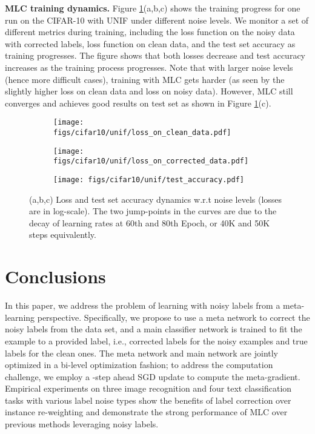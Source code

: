 \textbf{MLC training dynamics.} Figure \ref{fig:loss}(a,b,c) shows the training progress for one run
on the CIFAR-10 with \textsf{UNIF} under different noise levels. We
monitor a set of different metrics during training, including the loss
function on the noisy data with corrected labels, loss function
on clean data, and the test set accuracy as training progresses. The
figure shows that both losses decrease and test accuracy increases as
the training process progresses. Note that with larger noise levels
(hence more difficult cases), training with MLC gets harder (as seen
by the slightly higher loss on clean data and loss on noisy
data). However, MLC still converges and achieves
good results on test set as shown in Figure \ref{fig:loss}(c). 


\begin{figure}[t]\centering
  \begin{subfigure}{0.32\linewidth}
      \centering
    \texttt{[image: figs/cifar10/unif/loss\_on\_clean\_data.pdf]}
    \caption{}
  \end{subfigure}
  \begin{subfigure}{0.32\linewidth}
      \centering
      \texttt{[image: figs/cifar10/unif/loss\_on\_corrected\_data.pdf]}
      \caption{}
    \end{subfigure}
  \begin{subfigure}{0.32\linewidth}
      \centering
      \texttt{[image: figs/cifar10/unif/test\_accuracy.pdf]}
      \caption{}
  \end{subfigure}
  \caption{(a,b,c) Loss and test set accuracy dynamics w.r.t noise levels (losses are
    in log-scale). The two jump-points in the curves are due to the
    decay of learning rates at 60th and 80th Epoch, or  40K and
    50K steps equivalently.}
  \label{fig:loss}
\end{figure}


\section{Conclusions}
\label{sec:conclusion}

In this paper, we address the problem of learning with noisy labels
from a meta-learning perspective. Specifically, we propose to use a
meta network to correct the noisy labels from the data set, and a main
classifier network is trained to fit the example to a provided label,
i.e., corrected labels for the noisy examples and true labels for the
clean ones. The meta network and main network are jointly optimized in
a bi-level optimization fashion; to address the computation challenge,
we employ a -step ahead SGD update to compute the
meta-gradient. Empirical experiments on three image recognition and
four text classification tasks with various label noise types show the
benefits of label correction over instance re-weighting and
demonstrate the strong performance of MLC over previous methods
leveraging noisy labels.


